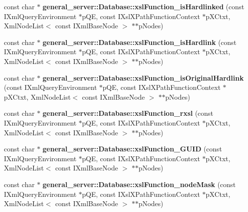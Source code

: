\begin{DoxyCompactItemize}
\item 
\hypertarget{group__XSLModule-Functions_ga7f6dadf6b17c3131a2231fd473a14fa0}{const char $\ast$ {\bfseries general\-\_\-server\-::\-Database\-::xsl\-Function\-\_\-is\-Hardlinked} (const \-I\-Xml\-Query\-Environment $\ast$p\-Q\-E, const \-I\-Xsl\-X\-Path\-Function\-Context $\ast$p\-X\-Ctxt, \-Xml\-Node\-List$<$ const \-I\-Xml\-Base\-Node $>$ $\ast$$\ast$p\-Nodes)}\label{group__XSLModule-Functions_ga7f6dadf6b17c3131a2231fd473a14fa0}

\item 
\hypertarget{group__XSLModule-Functions_gab43774d7fa0eb3ac4d798f0454f3de27}{const char $\ast$ {\bfseries general\-\_\-server\-::\-Database\-::xsl\-Function\-\_\-is\-Hardlink} (const \-I\-Xml\-Query\-Environment $\ast$p\-Q\-E, const \-I\-Xsl\-X\-Path\-Function\-Context $\ast$p\-X\-Ctxt, \-Xml\-Node\-List$<$ const \-I\-Xml\-Base\-Node $>$ $\ast$$\ast$p\-Nodes)}\label{group__XSLModule-Functions_gab43774d7fa0eb3ac4d798f0454f3de27}

\item 
\hypertarget{group__XSLModule-Functions_ga6339a94f68df306fe08789b5cc098a4d}{const char $\ast$ {\bfseries general\-\_\-server\-::\-Database\-::xsl\-Function\-\_\-is\-Original\-Hardlink} (const \-I\-Xml\-Query\-Environment $\ast$p\-Q\-E, const \-I\-Xsl\-X\-Path\-Function\-Context $\ast$p\-X\-Ctxt, \-Xml\-Node\-List$<$ const \-I\-Xml\-Base\-Node $>$ $\ast$$\ast$p\-Nodes)}\label{group__XSLModule-Functions_ga6339a94f68df306fe08789b5cc098a4d}

\item 
\hypertarget{group__XSLModule-Functions_ga6fec78d2c5935f0a26185cff307e3865}{const char $\ast$ {\bfseries general\-\_\-server\-::\-Database\-::xsl\-Function\-\_\-rxsl} (const \-I\-Xml\-Query\-Environment $\ast$p\-Q\-E, const \-I\-Xsl\-X\-Path\-Function\-Context $\ast$p\-X\-Ctxt, \-Xml\-Node\-List$<$ const \-I\-Xml\-Base\-Node $>$ $\ast$$\ast$p\-Nodes)}\label{group__XSLModule-Functions_ga6fec78d2c5935f0a26185cff307e3865}

\item 
\hypertarget{group__XSLModule-Functions_ga626c2e3651cab32141d4f1e5abd7234e}{const char $\ast$ {\bfseries general\-\_\-server\-::\-Database\-::xsl\-Function\-\_\-\-G\-U\-I\-D} (const \-I\-Xml\-Query\-Environment $\ast$p\-Q\-E, const \-I\-Xsl\-X\-Path\-Function\-Context $\ast$p\-X\-Ctxt, \-Xml\-Node\-List$<$ const \-I\-Xml\-Base\-Node $>$ $\ast$$\ast$p\-Nodes)}\label{group__XSLModule-Functions_ga626c2e3651cab32141d4f1e5abd7234e}

\item 
\hypertarget{group__XSLModule-Functions_ga45adf92cb3980e9f99981cb75d4a085e}{const char $\ast$ {\bfseries general\-\_\-server\-::\-Database\-::xsl\-Function\-\_\-node\-Mask} (const \-I\-Xml\-Query\-Environment $\ast$p\-Q\-E, const \-I\-Xsl\-X\-Path\-Function\-Context $\ast$p\-X\-Ctxt, \-Xml\-Node\-List$<$ const \-I\-Xml\-Base\-Node $>$ $\ast$$\ast$p\-Nodes)}\label{group__XSLModule-Functions_ga45adf92cb3980e9f99981cb75d4a085e}


\end{DoxyCompactItemize}
